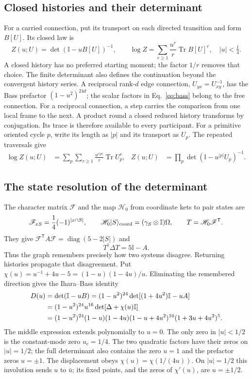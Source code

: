 \documentclass[aps,prx,onecolumn,10pt,notitlepage,nofootinbib,longbibliography]{revtex4-2}
\numberwithin{equation}{section}
\numberwithin{table}{section}
\newcommand{\Id}{\mathbb I}
\newcommand{\Tr}{\operatorname{Tr}}
\newcommand{\diag}{\operatorname{diag}}
\begin{document}
\subsection{Closed histories and their determinant}
For a carried connection, put its transport on each directed transition and form $B[U]$. Its closed law is
\begin{equation}
 Z(u;U)=\det(\Id-uB[U])^{-1},\qquad
 \log Z=\sum_{r\geq1}\frac{u^r}{r}\Tr B[U]^r,
 \quad |u|<\tfrac14.
 \label{eq:closedlaw}
\end{equation}
A closed history has no preferred starting moment; the factor $1/r$ removes that choice. The finite determinant also defines the continuation beyond the convergent history series. A reciprocal rank-$d$ edge connection, $U_{yx}=U_{xy}^{-1}$, has the Bass prefactor $(1-u^2)^{24d}$; the scalar factors in Eq.~\eqref{eq:bass} belong to the free connection. For a reciprocal connection, a step carries the comparison from one local
frame to the next. A product round a closed reduced history transforms by
conjugation. Its trace is therefore available to every participant. For a
primitive oriented cycle $p$, write its length as $|p|$ and its transport as
$U_p$. The repeated traversals give
\begin{align}
 \log Z(u;U)
 &=\sum_p\sum_{r\geq1}\frac{u^{r|p|}}{r}\Tr U_p^r,
 &Z(u;U)&=\prod_p\det(\Id-u^{|p|}U_p)^{-1}.
 \label{eq:eulerproduct}
\end{align}

\subsection{The state resolution of the determinant}
The character matrix $\mathscr F$ and the map $\mathscr H_0$ from coordinate kets to pair states are
\begin{equation}
 \mathscr F_{xS}=\frac14(-1)^{|x\cap S|},\qquad
 \mathscr H_0\lvert S\rangle_{\rm coord}=(\gamma_S\otimes\Id)\Omega,\qquad
 T=\mathscr H_0\mathscr F^{\mathsf T}.
\end{equation}
They give $\mathscr F^{\mathsf T}A\mathscr F=\diag(5-2|S|)$ and
\begin{equation}
 T^\dagger\Delta T=5\Id-A.
\end{equation}
Thus the graph remembers precisely how two systems disagree. Returning histories propagate that disagreement. Put $\chi(u)=u^{-1}+4u-5=(1-u)(1-4u)/u$. Eliminating the remembered direction gives the Ihara--Bass identity\cite{Ihara,Bass}
\begin{align}
 D(u)&=\det(\Id-uB)
 =(1-u^2)^{24}\det[(1+4u^2)\Id-uA]\notag\\
 &=(1-u^2)^{24}u^{16}\det[\Delta+\chi(u)\Id]\notag\\
 &=(1-u^2)^{24}(1-u)(1-4u)
 (1-u+4u^2)^{10}(1+3u+4u^2)^5.
 \label{eq:bass}
\end{align}
The middle expression extends polynomially to $u=0$. The only zero in $|u|<1/2$ is the constant-mode zero $u_c=1/4$. The two quadratic factors have their zeros on $|u|=1/2$; the full determinant also contains the zero $u=1$ and the prefactor zeros $u=\pm1$. The displacement obeys $\chi(u)=\chi(1/(4u))$. On $|u|=1/2$ this involution sends $u$ to $\bar u$; its fixed points, and the zeros of $\chi'(u)$, are $u=\pm1/2$.
\end{document}
